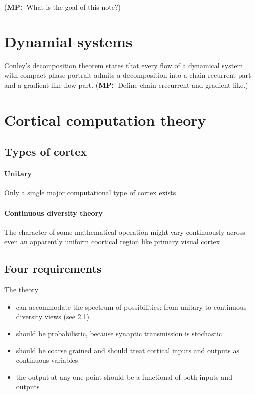 \documentclass{scrartcl}
\title{}
\author{\'Abel S\'agodi}
\date{September 1, 2023}
\newcommand{\mpcomment}[1]{(\textbf{MP:\ }\textcolor{mpcolor}{#1})}
\theoremstyle{definition}
\theoremstyle{remark}
\begin{document}
\maketitle

\mpcomment{What is the goal of this note?}

\section{Dynamial systems}
Conley's decomposition theorem states that every flow of a dynamical system with compact phase portrait admits a decomposition into a chain-recurrent part and a gradient-like flow part.
\mpcomment{Define chain-crecurrent and gradient-like.}

\section{Cortical computation theory}
\citep{stevens1995}

\subsection{Types of cortex}\label{sec:types}
\paragraph{Unitary}
Only a single major computational type of cortex exists

\paragraph{Continuous diversity theory}
The character of some mathematical operation might vary continuously across even an apparently uniform coortical region like primary visual cortex



\subsection{Four requirements}
The theory 
\begin{itemize}
\item can accommodate the spectrum of possibilities: from unitary to continuous  diversity views (see \ref{sec:types})
\item should be probabilistic, because synaptic transmission is stochastic 
\item should be coarse grained and should treat cortical inputs and outputs as continuous variables
\item the output at any one point should be a functional of both inputs and outputs 
\end{itemize}
\end{document}

